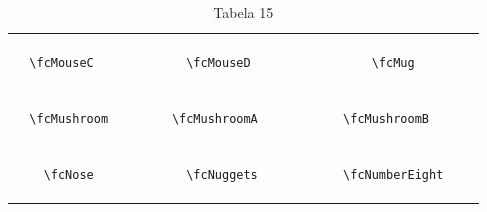 \documentclass[x11names]{article}
\begin{document}
\begin{table}[H]
\begin{tabular}{|c|c|c|c|c|c|}
		&\multirow{5}{*}{	\fcMouseC	[scale=0.16]} & &\multirow{5}{*}{	\fcMouseD	[scale=0.16]} & &\multirow{5}{*}{	\fcMug	[scale=0.64]}\\	& & & & & \\	& & & & & \\	\verb|	\fcMouseC	| & & \verb|	\fcMouseD	| & & \verb|	\fcMug	| & \\	& & & & & \\	& & & & & \\	& & & & & \\	\hline									
		&\multirow{5}{*}{	\fcMushroom	[scale=0.16]} & &\multirow{5}{*}{	\fcMushroomA	[scale=0.16]} & &\multirow{5}{*}{	\fcMushroomB	[scale=0.16]}\\	& & & & & \\	& & & & & \\	\verb|	\fcMushroom	| & & \verb|	\fcMushroomA	| & & \verb|	\fcMushroomB	| & \\	& & & & & \\	& & & & & \\	& & & & & \\	\hline									
		&\multirow{5}{*}{	\fcNose	[scale=0.16]} & &\multirow{5}{*}{	\fcNuggets	[scale=0.16]} & &\multirow{5}{*}{	\fcNumberEight	[scale=0.16]}\\	& & & & & \\	& & & & & \\	\verb|	\fcNose	| & & \verb|	\fcNuggets	| & & \verb|	\fcNumberEight	| & \\	& & & & & \\	& & & & & \\	& & & & & \\		\hline 	\hline 	\end{tabular}	\caption{	Tabela 15	}\label{	Tab15	}\end{table}
\end{document}
